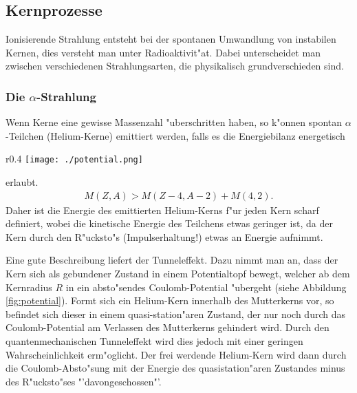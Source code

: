 \documentclass[12pt]{article}
\begin{document}
\subsection{Kernprozesse}
Ionisierende Strahlung entsteht bei der spontanen Umwandlung von instabilen Kernen, dies versteht man unter Radioaktivit"at. Dabei unterscheidet man zwischen verschiedenen Strahlungsarten, die physikalisch grundverschieden sind.
\subsubsection{Die $\alpha$-Strahlung}
Wenn Kerne eine gewisse Massenzahl "uberschritten haben, so k"onnen spontan $\alpha$-Teilchen (Helium-Kerne) emittiert werden, falls es die Energiebilanz energetisch 
\begin{wrapfigure}{r}{0.4\textwidth}
	\texttt{[image: ./potential.png]}
	\caption[Potential $\alpha$-Zerfall]{Kernpotential beim $\alpha$-Zerfall - gut zu sehen ist der quasistation"are Zustand des gebildeten He-Kernes \cite{povh}.}    
	\label{fig:potential}
\end{wrapfigure}
erlaubt.
\begin{align}
M(Z,A)>M(Z-4,A-2)+M(4,2).
\end{align}
Daher ist die Energie des emittierten Helium-Kerns f"ur jeden Kern scharf definiert, wobei die kinetische Energie des Teilchens etwas geringer ist, da der Kern durch den R"ucksto"s (Impulserhaltung!) etwas an Energie aufnimmt.\par
Eine gute Beschreibung liefert der Tunneleffekt. Dazu nimmt man an, dass der Kern sich als gebundener Zustand in einem Potentialtopf bewegt, welcher ab dem Kernradius $R$ in ein absto"sendes Coulomb-Potential "ubergeht (siehe Abbildung \ref{fig:potential}). Formt sich ein Helium-Kern innerhalb des Mutterkerns vor, so befindet sich dieser in einem quasi-station"aren Zustand, der nur noch durch das Coulomb-Potential am Verlassen des Mutterkerns gehindert wird. Durch den quantenmechanischen Tunneleffekt wird dies jedoch mit einer geringen Wahrscheinlichkeit erm"oglicht. Der frei werdende Helium-Kern wird dann durch die Coulomb-Absto"sung mit der Energie des quasistation"aren Zustandes minus des R"ucksto"ses "'davongeschossen"'.   
\end{document}
